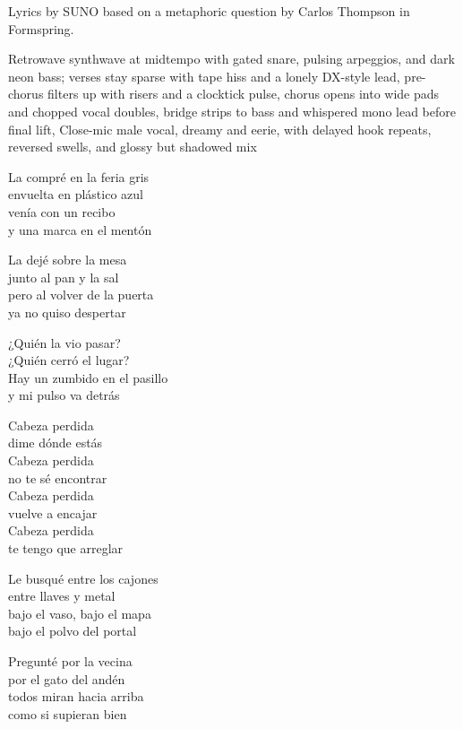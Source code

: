 
\begin{notes}
Lyrics by SUNO based on a metaphoric question by Carlos Thompson in Formspring.
\end{notes}
\begin{style}
Retrowave synthwave at midtempo with gated snare, pulsing arpeggios, and dark neon bass; verses stay sparse with tape hiss and a lonely DX-style lead, pre-chorus filters up with risers and a clocktick pulse, chorus opens into wide pads and chopped vocal doubles, bridge strips to bass and whispered mono lead before final lift, Close-mic male vocal, dreamy and eerie, with delayed hook repeats, reversed swells, and glossy but shadowed mix
\end{style}
\begin{lyrics}
La compré en la feria gris\\
envuelta en plástico azul\\
venía con un recibo\\
y una marca en el mentón

La dejé sobre la mesa\\
junto al pan y la sal\\
pero al volver de la puerta\\
ya no quiso despertar

¿Quién la vio pasar?\\
¿Quién cerró el lugar?\\
Hay un zumbido en el pasillo\\
y mi pulso va detrás

Cabeza perdida\\
dime dónde estás\\
Cabeza perdida\\
no te sé encontrar\\
Cabeza perdida\\
vuelve a encajar\\
Cabeza perdida\\
te tengo que arreglar

Le busqué entre los cajones\\
entre llaves y metal\\
bajo el vaso, bajo el mapa\\
bajo el polvo del portal

Pregunté por la vecina\\
por el gato del andén\\
todos miran hacia arriba\\
como si supieran bien


\end{lyrics}

